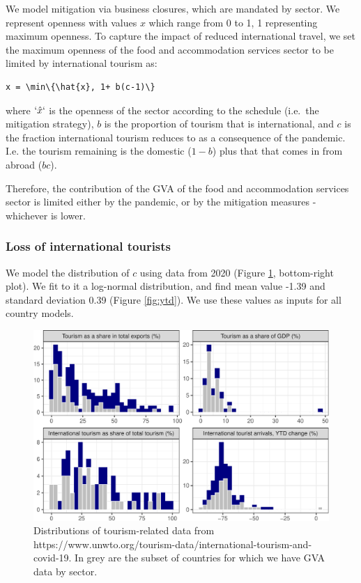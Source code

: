 \documentclass[
]{article}
\begin{document}
We model mitigation via business closures, which are mandated by sector. We represent openness with values \(x\) which range from 0 to 1, 1 representing maximum openness. To capture the impact of reduced international travel, we set the maximum openness of the food and accommodation services sector to be limited by international tourism as:

\begin{verbatim}
x = \min\{\hat{x}, 1+ b(c-1)\}
\end{verbatim}

where \(`\hat{x}`\) is the openness of the sector according to the schedule (i.e.~the mitigation strategy), \(b\) is the proportion of tourism that is international, and \(c\) is the fraction international tourism reduces to as a consequence of the pandemic. I.e. the tourism remaining is the domestic (\(1-b\)) plus that that comes in from abroad (\(bc\)).

Therefore, the contribution of the GVA of the food and accommodation services sector is limited either by the pandemic, or by the mitigation measures - whichever is lower.

\hypertarget{loss-of-international-tourists}{%
\subsubsection{Loss of international tourists}\label{loss-of-international-tourists}}

We model the distribution of \(c\) using data from 2020 (Figure \ref{fig:tourismhist}, bottom-right plot). We fit to it a log-normal distribution, and find mean value -1.39 and standard deviation 0.39 (Figure \ref{fig:ytd}). We use these values as inputs for all country models.

\begin{figure}

{\centering \includegraphics{README_files/figure-latex/tourismhist-1} 

}

\caption{Distributions of tourism-related data from https://www.unwto.org/tourism-data/international-tourism-and-covid-19. In grey are the subset of countries for which we have GVA data by sector.}\label{fig:tourismhist}
\end{figure}
\end{document}
